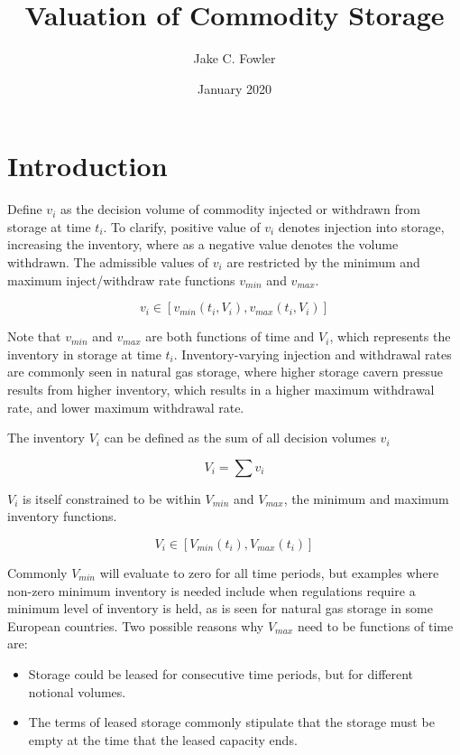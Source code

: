 \documentclass{article}
\title{Valuation of Commodity Storage}
\author{Jake C. Fowler}
\date{January 2020}
\begin{document}
\newcommand{\+}[1]{\ensuremath{\mathbf{#1}}}

\maketitle

\section{Introduction}

Define $v_i$ as the decision volume of commodity injected or withdrawn from storage at time
$t_i$. To clarify, positive value of $v_i$ denotes injection into storage, increasing the
inventory, where as a negative value denotes the volume withdrawn. The admissible values
of $v_i$ are restricted by the minimum and maximum inject/withdraw rate functions
$v_{min}$ and $v_{max}$.

\begin{equation}
    v_i \in [v_{min}(t_i, V_i), v_{max}(t_i, V_i)]
\end{equation}

Note that $v_{min}$ and $v_{max}$ are both functions of time and $V_i$, which represents the
inventory in storage at time $t_i$. Inventory-varying injection and withdrawal rates are commonly
seen in natural gas storage, where higher storage cavern pressue results from higher inventory,
which results in a higher maximum withdrawal rate, and lower maximum withdrawal rate.

\bigskip

The inventory $V_i$ can be defined as the sum of all decision volumes $v_i$

\begin{equation}
    V_i = \sum{v_i}
\end{equation}

$V_i$ is itself constrained to be within $V_{min}$ and $V_{max}$, the minimum and maximum
inventory functions.

\begin{equation}
    V_i \in [V_{min}(t_i), V_{max}(t_i)]
\end{equation}

Commonly $V_{min}$ will evaluate to zero for all time periods, but examples
where non-zero minimum inventory is needed include when regulations require a minimum
level of inventory is held, as is seen for natural gas storage in some European countries.
Two possible reasons why $V_{max}$ need to be functions of time are:
\begin{itemize}
    \item Storage could be leased for consecutive time periods, but for different notional
    volumes.
    \item The terms of leased storage commonly stipulate that the storage must be empty
    at the time that the leased capacity ends.
\end{itemize}
\end{document}
